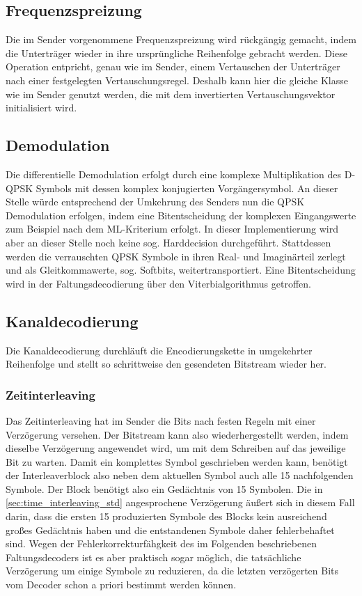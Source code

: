 
\subsection{Frequenzspreizung}
Die im Sender vorgenommene Frequenzspreizung wird rückgängig gemacht, indem die Unterträger wieder in ihre ursprüngliche Reihenfolge gebracht werden. Diese Operation entpricht, genau wie im Sender, einem Vertauschen der Unterträger nach einer festgelegten Vertauschungsregel. Deshalb kann hier die gleiche Klasse wie im Sender genutzt werden, die mit dem invertierten Vertauschungsvektor initialisiert wird.

\subsection{Demodulation}
Die differentielle Demodulation erfolgt durch eine komplexe Multiplikation des D-QPSK Symbols mit dessen komplex konjugierten Vorgängersymbol.
An dieser Stelle würde entsprechend der Umkehrung des Senders nun die QPSK Demodulation erfolgen, indem eine Bitentscheidung der komplexen Eingangswerte zum Beispiel nach dem \ac{ML}-Kriterium erfolgt. In dieser Implementierung wird aber an dieser Stelle noch keine sog. Harddecision durchgeführt. Stattdessen werden die verrauschten QPSK Symbole in ihren Real- und Imaginärteil zerlegt und als Gleitkommawerte, sog. Softbits, weitertransportiert. Eine Bitentscheidung wird in der Faltungsdecodierung über den Viterbialgorithmus getroffen.

\subsection{Kanaldecodierung}
Die Kanaldecodierung durchläuft die Encodierungskette in umgekehrter Reihenfolge und stellt so schrittweise den gesendeten Bitstream wieder her.

\subsubsection{Zeitinterleaving}
Das Zeitinterleaving hat im Sender die Bits nach festen Regeln mit einer Verzögerung versehen. Der Bitstream kann also wiederhergestellt werden, indem dieselbe Verzögerung angewendet wird, um mit dem Schreiben auf das jeweilige Bit zu warten. Damit ein komplettes Symbol geschrieben werden kann, benötigt der Interleaverblock also neben dem aktuellen Symbol auch alle 15 nachfolgenden Symbole. Der Block benötigt also ein Gedächtnis von 15 Symbolen. Die in \ref{sec:time_interleaving_std} angesprochene Verzögerung äußert sich in diesem Fall darin, dass die ersten 15 produzierten Symbole des Blocks kein ausreichend großes Gedächtnis haben und die entstandenen Symbole daher fehlerbehaftet sind. Wegen der Fehlerkorrekturfähgkeit des im Folgenden beschriebenen Faltungsdecoders ist es aber praktisch sogar möglich, die tatsächliche Verzögerung um einige Symbole zu reduzieren, da die letzten verzögerten Bits vom Decoder schon a priori bestimmt werden können.

